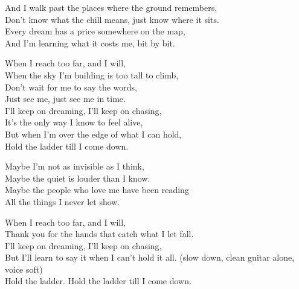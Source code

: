 \begin{lyrics}
And I walk past the places where the ground remembers,\\
Don’t know what the chill means, just know where it sits.\\
Every dream has a price somewhere on the map,\\
And I’m learning what it costs me, bit by bit.

When I reach too far, and I will,\\
When the sky I’m building is too tall to climb,\\
Don’t wait for me to say the words,\\
Just see me, just see me in time.\\
I’ll keep on dreaming, I’ll keep on chasing,\\
It’s the only way I know to feel alive,\\
But when I’m over the edge of what I can hold,\\
Hold the ladder till I come down.

Maybe I’m not as invisible as I think,\\
Maybe the quiet is louder than I know.\\
Maybe the people who love me have been reading\\
All the things I never let show.


When I reach too far, and I will,\\
Thank you for the hands that catch what I let fall.\\
I’ll keep on dreaming, I’ll keep on chasing,\\
But I’ll learn to say it when I can’t hold it all.
(slow down, clean guitar alone, voice soft)\\
Hold the ladder. Hold the ladder till I come down.
\end{lyrics}

